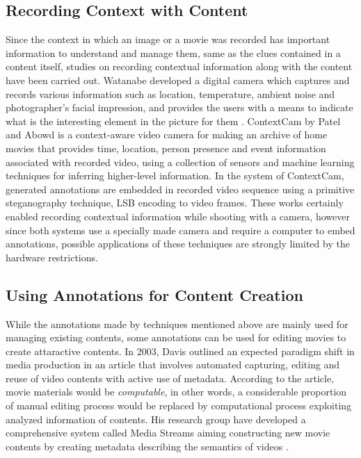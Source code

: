 \subsection{Recording Context with Content}
Since the context in which an image or a movie was recorded has important information to understand and manage them, same as the clues contained in a content itself, studies on recording contextual information along with the content have been carried out.
Watanabe developed a digital camera which captures and records various information such as location, temperature, ambient noise and photographer's facial impression, and provides the users with a means to indicate what is the interesting element in the picture for them \cite{Watanabe:2007:WDC:1240866.1241073}.
ContextCam by Patel and Abowd \cite{Patel04thecontextcam:} is a context-aware video camera for making an archive of home movies that provides time, location, person presence and event information associated with recorded video, using a collection of sensors and machine learning techniques for inferring higher-level information.
In the system of ContextCam, generated annotations are embedded in recorded video sequence using a primitive steganography technique, LSB encoding to video frames.
These works certainly enabled recording contextual information while shooting with a camera, however since both systems use a specially made camera and require a computer to embed annotations, possible applications of these techniques are strongly limited by the hardware restrictions.

\subsection{Using Annotations for Content Creation}
While the annotations made by techniques mentioned above are mainly used for managing existing contents, some annotations can be used for editing movies to create attaractive contents.
In 2003, Davis outlined an expected paradigm shift in media production in an article \cite{davis2003editing} that involves automated capturing, editing and reuse of video contents with active use of metadata.
According to the article, movie materials would be {\it computable}, in other words, a considerable proportion of manual editing process would be replaced by computational process exploiting analyzed information of contents.
His research group have developed a comprehensive system called Media Streams aiming constructing new movie contents by creating metadata describing the semantics of videos \cite{davis2000media}.

